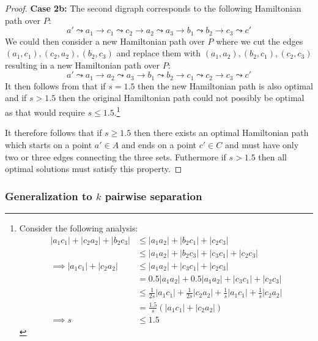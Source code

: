 \documentclass{article}
\theoremstyle{definition}
\begin{document}
\begin{proof}
    \textbf{Case 2b:} The second digraph corresponds to the following Hamiltonian path over $P$:
    $$a' \leadsto a_1 \to c_1 \leadsto c_2 \to a_2 \leadsto a_3 \to b_1 \leadsto b_2 \to c_3 \leadsto c'$$
    We could then consider a new Hamiltonian path over $P$ where we cut the edges $(a_1, c_1), (c_2, a_2), (b_2, c_3)$ and replace them with $(a_1, a_2), (b_2, c_1), (c_2, c_3)$ resulting in a new Hamiltonian path over $P$:
    $$a' \leadsto a_1 \to a_2 \leadsto a_3 \to b_1 \leadsto b_2 \to c_1 \leadsto c_2 \to c_3 \leadsto c'$$
    It then follows from  that if $s = 1.5$ then the new Hamiltonian path is also optimal and if $s > 1.5$ then the original Hamiltonian path could not possibly be optimal as that would require $s \leq 1.5$.\footnote{Consider the following analysis:
        \begin{align*}
            |a_1 c_1| + |c_2 a_2| + |b_2 c_3| &\leq |a_1 a_2| + |b_2 c_1| + |c_2 c_3| \\
            &\leq |a_1 a_2| + |b_2 c_3| + |c_3 c_1| + |c_2 c_3| \\
            \implies |a_1 c_1| + |c_2 a_2| &\leq |a_1 a_2| + |c_3 c_1| + |c_2 c_3| \\
            &= 0.5 |a_1 a_2| + 0.5 |a_1 a_2| + |c_3 c_1| + |c_2 c_3| \\
            &\leq \frac{1}{2s} |a_1 c_1| + \frac{1}{2s} |c_2 a_2| + \frac{1}{s} |a_1 c_1| + \frac{1}{s} |c_2 a_2| \\
            &= \frac{1.5}{s} (|a_1 c_1| + |c_2 a_2|) \\
            \implies s &\leq 1.5
        \end{align*}
    }

    It therefore follows that if $s \geq 1.5$ then there exists an optimal Hamiltonian path which starts on a point $a' \in A$ and ends on a point $c' \in C$ and must have only two or three edges connecting the three sets.
    Futhermore if $s > 1.5$ then all optimal solutions must satisfy this property.
\end{proof}



\subsubsection{Generalization to \texorpdfstring{$k$}{k} pairwise separation}
\end{document}
